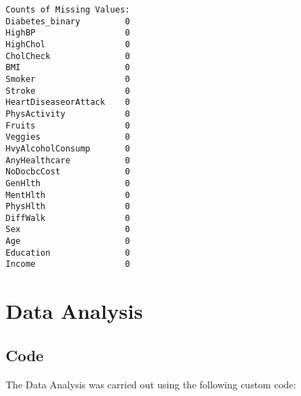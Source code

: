 \documentclass[11pt]{article}
\begin{document}
\begin{Verbatim}[tabsize=4]
Counts of Missing Values:
Diabetes_binary         0
HighBP                  0
HighChol                0
CholCheck               0
BMI                     0
Smoker                  0
Stroke                  0
HeartDiseaseorAttack    0
PhysActivity            0
Fruits                  0
Veggies                 0
HvyAlcoholConsump       0
AnyHealthcare           0
NoDocbcCost             0
GenHlth                 0
MentHlth                0
PhysHlth                0
DiffWalk                0
Sex                     0
Age                     0
Education               0
Income                  0

\end{Verbatim}

\section*{Data Analysis} \subsection*{Code}The Data Analysis was carried out using the following custom code:
\end{document}
